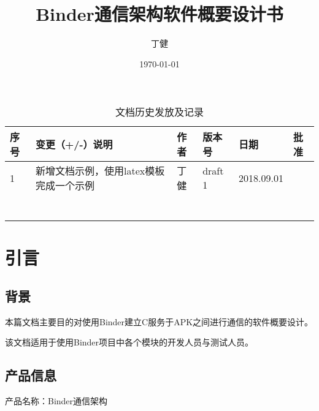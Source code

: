 \documentclass[10pt,a4paper,titlepage]{article} %
\title{Binder通信架构软件概要设计书}
\author{丁健}
\date{ \today }
\begin{document}
\maketitle
\clearpage
\pagestyle{empty}
\pagestyle{fancy}   %
\rhead{\today}
\cfoot{}
\setcounter{page}{1}
\renewcommand{\thetable}{}
\renewcommand{\captionfont}{\Large}
\begin{table}[h]
\Large   
\caption{文档历史发放及记录}  
\begin{center}  
\begin{tabular}{|m{1.5cm}<{\centering}|m{4.5cm}<{\centering}|m{2cm}<{\centering}|m{2cm}<{\centering}|m{2.2cm}<{\centering}|m{1.3cm}<{\centering}|}  
\hline  
序号 & 变更（+/-）说明 & 作者 & 版本号 & 日期 & 批准 \\ \hline  
1 & 新增文档示例，使用latex模板完成一个示例 & 丁健 & draft 1 & 2018.09.01 &  \\ \hline
  &  &  &  &  &  \\ \hline
  &  &  &  &  &  \\ \hline
  &  &  &  &  &  \\ \hline
  &  &  &  &  &  \\ \hline 
  &  &  &  &  &  \\ \hline
  &  &  &  &  &  \\ \hline
  &  &  &  &  &  \\ \hline 

\end{tabular}  
\end{center}  
\end{table} 
\clearpage
\tableofcontents  %
\clearpage
\setcounter{page}{1}
\section{引言}
\subsection{背景}
本篇文档主要目的对使用Binder建立C服务于APK之间进行通信的软件概要设计。

该文档适用于使用Binder项目中各个模块的开发人员与测试人员。

\subsection{产品信息}
产品名称：Binder通信架构
\end{document}
